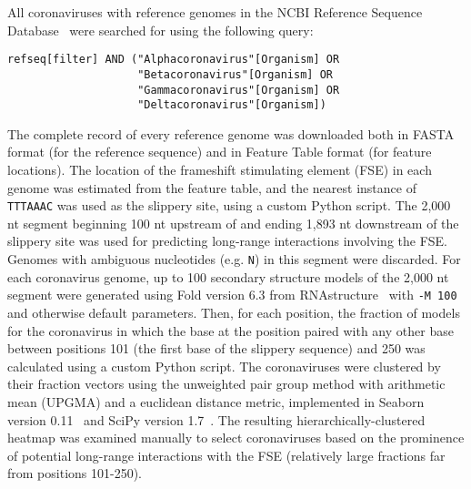 \documentclass[main.tex]{subfiles}
\begin{document}
All coronaviruses with reference genomes in the NCBI Reference Sequence Database~\cite{OLeary2016} were searched for using the following query:
\begin{verbatim}
refseq[filter] AND ("Alphacoronavirus"[Organism] OR
                    "Betacoronavirus"[Organism] OR
                    "Gammacoronavirus"[Organism] OR
                    "Deltacoronavirus"[Organism])
\end{verbatim}
The complete record of every reference genome was downloaded both in FASTA format (for the reference sequence) and in Feature Table format (for feature locations).
The location of the frameshift stimulating element (FSE) in each genome was estimated from the feature table, and the nearest instance of \verb|TTTAAAC| was used as the slippery site, using a custom Python script.
The 2,000 nt segment beginning 100 nt upstream of and ending 1,893 nt downstream of the slippery site was used for predicting long-range interactions involving the FSE.
Genomes with ambiguous nucleotides (e.g. \verb|N|) in this segment were discarded.
For each coronavirus genome, up to 100 secondary structure models of the 2,000 nt segment were generated using Fold version 6.3 from RNAstructure~\cite{Mathews2004a} with \verb|-M 100| and otherwise default parameters.
Then, for each position, the fraction of models for the coronavirus in which the base at the position paired with any other base between positions 101 (the first base of the slippery sequence) and 250 was calculated using a custom Python script.
The coronaviruses were clustered by their fraction vectors using the unweighted pair group method with arithmetic mean (UPGMA) and a euclidean distance metric, implemented in Seaborn version 0.11~\cite{Waskom2021} and SciPy version 1.7~\cite{Virtanen2020}.
The resulting hierarchically-clustered heatmap was examined manually to select coronaviruses based on the prominence of potential long-range interactions with the FSE (relatively large fractions far from positions 101-250).
\end{document}
